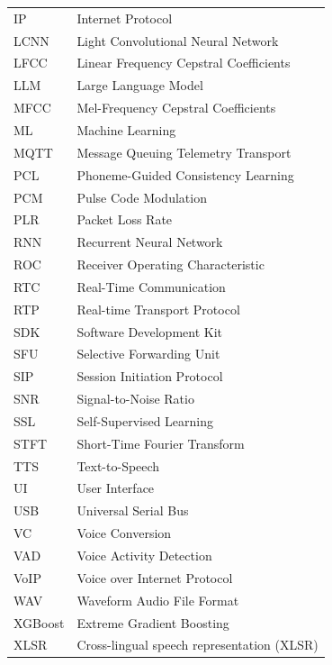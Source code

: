 \begin{longtable}{@{}p{5cm} p{11cm}}
IP        & Internet Protocol \\[0.2cm]
LCNN      & Light Convolutional Neural Network \\[0.2cm]
LFCC      & Linear Frequency Cepstral Coefficients \\[0.2cm]
LLM       & Large Language Model \\[0.2cm]
MFCC      & Mel-Frequency Cepstral Coefficients \\[0.2cm]
ML        & Machine Learning \\[0.2cm]
MQTT      & Message Queuing Telemetry Transport \\[0.2cm]
PCL       & Phoneme-Guided Consistency Learning \\[0.2cm]
PCM       & Pulse Code Modulation \\[0.2cm]
PLR       & Packet Loss Rate \\[0.2cm]
RNN       & Recurrent Neural Network \\[0.2cm]
ROC       & Receiver Operating Characteristic \\[0.2cm]
RTC       & Real-Time Communication \\[0.2cm]
RTP       & Real-time Transport Protocol \\[0.2cm]
SDK       & Software Development Kit \\[0.2cm]
SFU       & Selective Forwarding Unit \\[0.2cm]
SIP       & Session Initiation Protocol \\[0.2cm]
SNR       & Signal-to-Noise Ratio \\[0.2cm]
SSL       & Self-Supervised Learning \\[0.2cm]
STFT      & Short-Time Fourier Transform \\[0.2cm]
TTS       & Text-to-Speech \\[0.2cm]
UI        & User Interface \\[0.2cm]
USB       & Universal Serial Bus \\[0.2cm]
VC        & Voice Conversion \\[0.2cm]
VAD       & Voice Activity Detection \\[0.2cm]
VoIP      & Voice over Internet Protocol \\[0.2cm]
WAV       & Waveform Audio File Format \\[0.2cm]
XGBoost   & Extreme Gradient Boosting \\[0.2cm]
XLSR      & Cross-lingual speech representation (XLSR) \\[0.2cm]

\end{longtable}